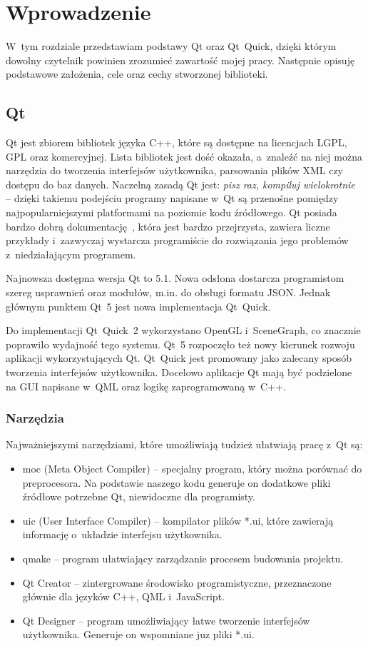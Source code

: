 \chapter{Wprowadzenie}
W~tym rozdziale przedstawiam podstawy Qt oraz Qt~Quick, dzięki którym dowolny czytelnik powinien zrozumieć zawartość mojej pracy. Następnie opisuję podstawowe założenia, cele oraz cechy stworzonej biblioteki.

\section{Qt}
Qt jest zbiorem bibliotek języka C++, które są dostępne na licencjach LGPL, GPL oraz komercyjnej. Lista bibliotek jest dość okazała, a~znaleźć na niej można narzędzia do tworzenia interfejsów użytkownika, parsowania plików XML czy dostępu do baz danych. Naczelną zasadą Qt jest: \textit{pisz raz, kompiluj wielokrotnie}~\cite{Qt:Whitepaper} -- dzięki takiemu podejściu programy napisane w~Qt są przenośne pomiędzy najpopularniejszymi platformami na poziomie kodu źródłowego. Qt posiada bardzo dobrą dokumentację~\cite{Qt:Dokumentacja}, która jest bardzo przejrzysta, zawiera liczne przykłady i~zazwyczaj wystarcza programiście do rozwiązania jego problemów z~niedziałającym programem.

Najnowsza dostępna wersja Qt to 5.1. Nowa odsłona dostarcza programistom szereg usprawnień oraz modułów, m.in. do obsługi formatu JSON. Jednak głównym punktem Qt~5 jest nowa implementacja Qt~Quick. 

Do implementacji Qt~Quick~2 wykorzystano OpenGL i~SceneGraph, co znacznie poprawiło wydajność tego systemu. Qt~5 rozpoczęło też nowy kierunek rozwoju aplikacji wykorzystujących Qt. Qt~Quick jest promowany jako zalecany sposób tworzenia interfejsów użytkownika. Docelowo aplikacje Qt mają być podzielone na GUI napisane w~QML oraz logikę zaprogramowaną w~C++.

\subsection{Narzędzia}
Najważniejszymi narzędziami, które umożliwiają tudzież ułatwiają pracę z~Qt są:
\begin{itemize}
\item moc (Meta Object Compiler) -- specjalny program, który można porównać do preprocesora. Na podstawie naszego kodu generuje on dodatkowe pliki źródłowe potrzebne Qt, niewidoczne dla programisty.
\item uic (User Interface Compiler) -- kompilator plików *.ui, które zawierają informację o~układzie interfejsu użytkownika.
\item qmake -- program ułatwiający zarządzanie procesem budowania projektu.
\item Qt Creator -- zintergrowane środowisko programistyczne, przeznaczone głównie dla języków C++, QML i~JavaScript.
\item Qt Designer -- program umożliwiający łatwe tworzenie interfejsów użytkownika. Generuje on wspomniane juz pliki *.ui.
\end{itemize}


